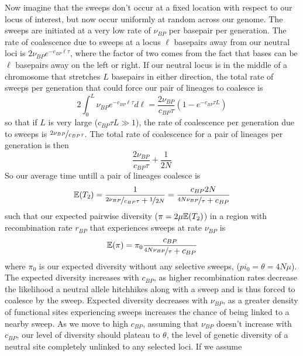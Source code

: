 Now imagine that the sweeps don't occur at a fixed location with
respect to our locus of interest, but now occur uniformly at random
across our genome. The sweeps are initiated at a very low rate of
$\nu_{BP}$ per basepair per generation. The rate of coalescence due to
sweeps at a locus $\ell$ basepairs away from our neutral loci is
$2\nu_{BP} e^{-c_{BP} \ell \tau}$, where the factor of two comes from
the fact that bases can be $\ell$ basepairs away on the left or right. If our neutral locus is in the
middle of a chromosome that stretches $L$ basepairs in either direction,
the total rate of sweeps per generation that could force our pair of lineages to coalesce is
\begin{equation}
2\int_0^{L} \nu_{BP} e^{-c_{BP} \ell \tau} d \ell =
\frac{2\nu_{BP}}{c_{BP} \tau} \left(1-e^{-c_{BP} \tau L} \right)
\end{equation}
so that if $L$ is very large ($c_{BP} \tau L \gg 1$), the rate of coalescence per
generation due to sweeps is $\nicefrac{2\nu_{BP}}{c_{BP} \tau}$. The total rate
of coalescence for a pair of lineages per generation is then
\begin{equation}
\frac{2\nu_{BP}}{c_{BP} \tau}+\frac{1}{2N}
\end{equation}
So our average time untill a pair of lineages coalesce is
\begin{equation}
\mathbb{E}(T_2) = \frac{1}{\nicefrac{2\nu_{BP}}{c_{BP} \tau}+\nicefrac{1}{2N}} = \frac{c_{BP}2N}{\nicefrac{4N\nu_{BP}}{ \tau}+c_{BP}}
\end{equation}
such that our expected pairwise diversity ($\pi=2\mu\mathbb{E}(T_2)$) in a region with
recombination rate $r_{BP}$ that experiences sweeps at rate $\nu_{BP}$
is  
\begin{equation}
\mathbb{E}(\pi) = \pi_0 \frac{c_{BP}}{\nicefrac{4N\nu_{BP}}{ \tau}+c_{BP}} \label{eqn:pi_GW_HH}
\end{equation}
where $\pi_0$ is our expected diversity without any selective sweeps, ($pi_0=\theta=4N\mu$).  The expected diversity increases with $c_{BP}$, as higher
recombination rates decrease the likelihood a neutral allele hitchhikes along with a sweep and is thus forced to
coalesce by the sweep. Expected diversity decreases with $\nu_{BP}$, as
a greater density of functional sites experiencing sweeps increases the chance of
being linked to a nearby sweep. As we move to high $c_{BP}$, assuming
that $\nu_{BP}$ doesn't increase with $c_{BP}$, our level of diversity
should plateau to $\theta$, the level of genetic diversity of a
neutral site completely unlinked to any selected loci. If we assume
